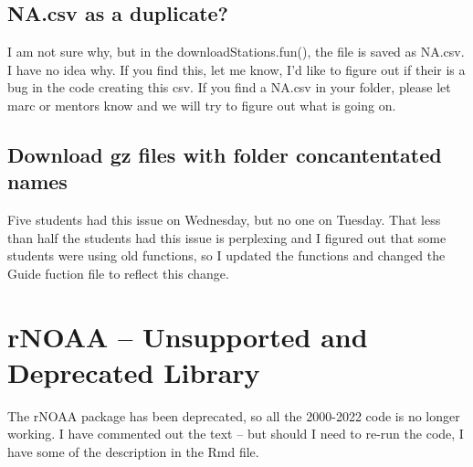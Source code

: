 \documentclass{article}\usepackage[]{graphicx}\usepackage[dvipsnames]{xcolor}
\begin{document}
\subsection{NA.csv as a duplicate?}

I am not sure why, but in the downloadStations.fun(), the file is saved as NA.csv. I have no idea why. If you find this, let me know, I'd like to figure out if their is a bug in the code creating this csv.
If you find a NA.csv in your folder, please let marc or mentors know and we will try to figure out what is going on.

\subsection{Download gz files with folder concantentated names}

Five students had this issue on Wednesday, but no one on Tuesday. That less than half the students had this issue is perplexing and I figured out that some students were using old functions, so I updated the functions and changed the Guide fuction file to reflect this change. 

\section{rNOAA -- Unsupported and Deprecated Library}

The rNOAA package has been deprecated, so all the 2000-2022 code is no longer working. I have commented out the text -- but should I need to re-run the code, I have some of the description in the Rmd file. 



\end{document}
